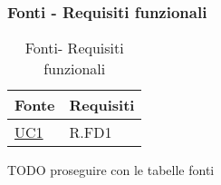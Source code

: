 \subsubsection{Fonti - Requisiti funzionali}
\begin{table}[H]
  \begin{center}
    \begin{longtable}{|P{4,5cm}|>{\arraybackslash}P{9cm}|}
      \hline
      \textbf{Fonte} & \textbf{Requisiti} \\
      \hline 
      
      \hyperref[UC1]{UC1} & R.FD1 \\
      \hline
    \end{longtable}
  \end{center}
  \caption{Fonti- Requisiti funzionali}
\end{table}

TODO proseguire con le tabelle fonti
